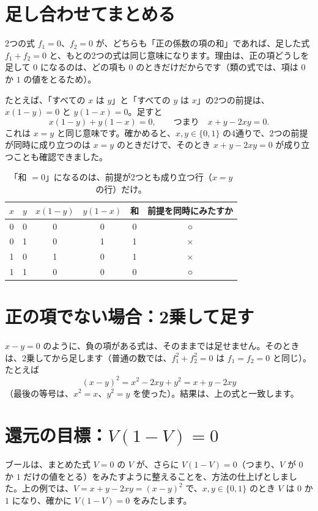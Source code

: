 \documentclass[a4paper,11pt,openany]{ltjsbook}
\begin{document}
\section{足し合わせてまとめる}

2つの式 $f_1=0$、$f_2=0$ が、どちらも「正の係数の項の和」であれば、足した式 $f_1+f_2=0$ と、もとの2つの式は同じ意味になります。理由は、正の項どうしを足して $0$ になるのは、どの項も $0$ のときだけだからです（類の式では、項は $0$ か $1$ の値をとるため）。

たとえば、「すべての $x$ は $y$」と「すべての $y$ は $x$」の2つの前提は、$x(1-y)=0$ と $y(1-x)=0$。足すと
\[
x(1-y)+y(1-x)=0,\qquad\text{つまり}\quad x+y-2xy=0 .
\]
これは $x=y$ と同じ意味です。確かめると、$x,y\in\{0,1\}$ の4通りで、2つの前提が同時に成り立つのは $x=y$ のときだけで、そのとき $x+y-2xy=0$ が成り立つことも確認できました。

\begin{table}[htbp]
\centering
\begin{tabular}{cc|cccc}
\toprule
$x$ & $y$ & $x(1-y)$ & $y(1-x)$ & 和 & 前提を同時にみたすか\\
\midrule
0 & 0 & 0 & 0 & 0 & ○\\
0 & 1 & 0 & 1 & 1 & ×\\
1 & 0 & 1 & 0 & 1 & ×\\
1 & 1 & 0 & 0 & 0 & ○\\
\bottomrule
\end{tabular}
\caption{「和 $=0$」になるのは、前提が2つとも成り立つ行（$x=y$ の行）だけ。}
\end{table}

\section{正の項でない場合：2乗して足す}

$x-y=0$ のように、負の項がある式は、そのままでは足せません。そのときは、2乗してから足します（普通の数では、$f_1^2+f_2^2=0$ は $f_1=f_2=0$ と同じ）。たとえば
\[
(x-y)^2=x^2-2xy+y^2=x+y-2xy
\]
（最後の等号は、$x^2=x$、$y^2=y$ を使った）。結果は、上の式と一致します。

\section{還元の目標：$V(1-V)=0$}

ブールは、まとめた式 $V=0$ の $V$ が、さらに $V(1-V)=0$（つまり、$V$ が $0$ か $1$ だけの値をとる）をみたすように整えることを、方法の仕上げとしました。上の例では、$V=x+y-2xy=(x-y)^2$ で、$x,y\in\{0,1\}$ のとき $V$ は $0$ か $1$ になり、確かに $V(1-V)=0$ をみたします。
\end{document}
